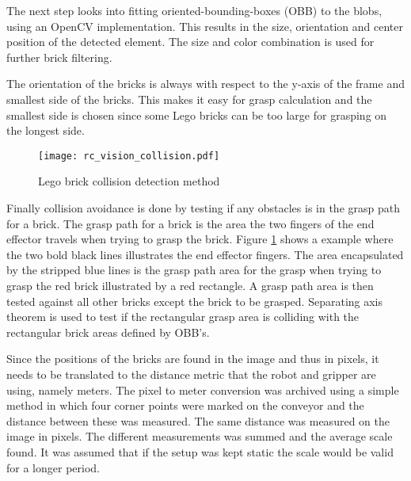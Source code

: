 The next step looks into fitting oriented-bounding-boxes (OBB) to the blobs, using an OpenCV\cite{opencv} implementation. This results in the size, orientation and center position of the detected element. The size and color combination is used for further brick filtering.

The orientation of the bricks is always with respect to the y-axis of the frame and smallest side of the bricks. This makes it easy for grasp calculation and the smallest side is chosen since some Lego bricks can be too large for grasping on the longest side. 
	
	\begin{figure}[H]
		\centering
	    \texttt{[image: rc\_vision\_collision.pdf]}
	    \caption{Lego brick collision detection method}
		\label{fig:rc_vision_collision}
	\end{figure}
	
Finally collision avoidance is done by testing if any obstacles is in the grasp path for a brick. The grasp path for a brick is the area the two fingers of the end effector travels when trying to grasp the brick. Figure \ref{fig:rc_vision_collision} shows a example where the two bold black lines illustrates the end effector fingers. The area encapsulated by the stripped blue lines is the grasp path area for the grasp when trying to grasp the red brick illustrated by a red rectangle. A grasp path area is then tested against all other bricks except the brick to be grasped. Separating axis theorem\cite{Gottschalk:1996:OHS:237170.237244} is used to test if the rectangular grasp area is colliding with the rectangular brick areas defined by OBB's.

Since the positions of the bricks are found in the image and thus in pixels, it needs to be translated to the distance metric that the robot and gripper are using, namely meters. The pixel to meter conversion was archived using a simple method in which four corner points were marked on the conveyor and the distance between these was measured. The same distance was measured on the image in pixels. The different measurements was summed and the average scale found. It was assumed that if the setup was kept static the scale would be valid for a longer period.

  